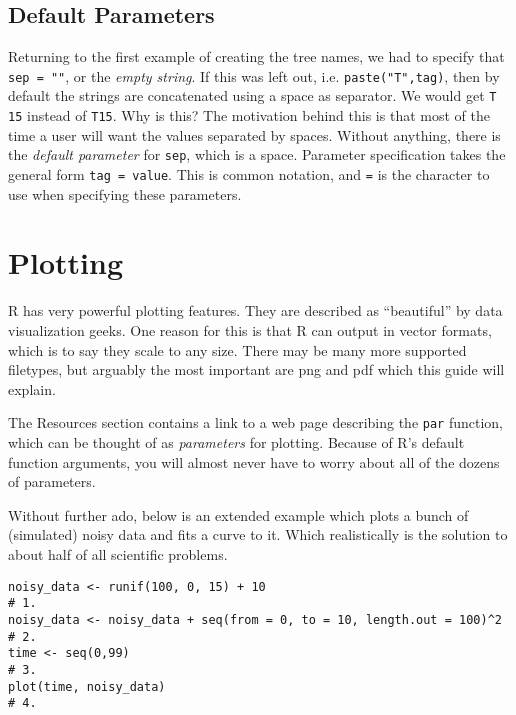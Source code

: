 \documentclass[12pt]{article}
\newtheorem{exercise}{Exercise}
\begin{document}


\subsection{Default Parameters}

Returning to the first example of creating the tree names, we had to specify that \verb|sep = ""|, or the \emph{empty string}. If this was left out, i.e. \verb|paste("T",tag)|, then by default the strings are concatenated using a space as separator. We would get \verb|T 15| instead of \verb|T15|. Why is this? The motivation behind this is that most of the time a user will want the values separated by spaces. Without anything, there is the \emph{default parameter} for \verb|sep|, which is a space. Parameter specification takes the general form \verb|tag = value|. This is common notation, and \verb|=| is the character to use when specifying these parameters.

\section{Plotting}

R has very powerful plotting features. They are described as ``beautiful'' by data visualization geeks. One reason for this is that R can output in vector formats, which is to say they scale to any size. There may be many more supported filetypes, but arguably the most important are png and pdf which this guide will explain.

The Resources section contains a link to a web page describing the \verb|par| function, which can be thought of as \emph{parameters} for plotting. Because of R's default function arguments, you will almost never have to worry about all of the dozens of parameters.

Without further ado, below is an extended example which plots a bunch of (simulated) noisy data and fits a curve to it. Which realistically is the solution to about half of all scientific problems.

\begin{verbatim}
noisy_data <- runif(100, 0, 15) + 10                                   # 1.
noisy_data <- noisy_data + seq(from = 0, to = 10, length.out = 100)^2  # 2.
time <- seq(0,99)                                                      # 3.
plot(time, noisy_data)                                                 # 4.
\end{verbatim}
\end{document}
